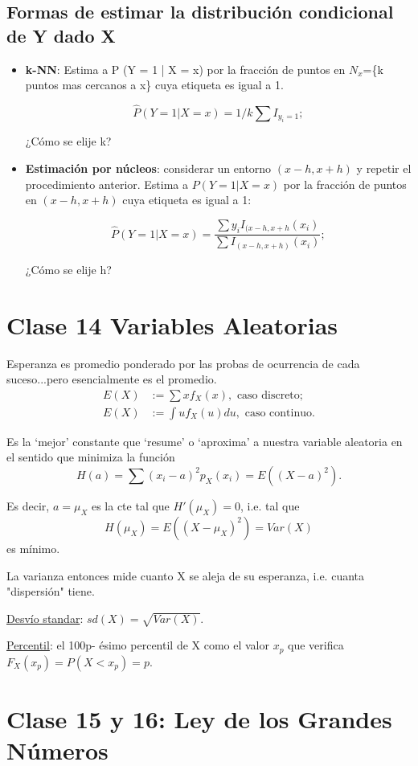 \documentclass[a4paper,12pt]{article}
\theoremstyle{definition}
\numberwithin{prop}{section}
\theoremstyle{remark}
\numberwithin{ej_subseccion}{subsection}
\begin{document}
	\subsection*{Formas de estimar la distribución condicional de Y dado X}
	
	\begin{itemize}
		\item \textbf{k-NN}: Estima a P (Y = 1 | X = x) por la fracción de puntos en $N_x$=\{k puntos mas cercanos a x\} cuya etiqueta es igual a 1.
		
		$$\hat{P}(Y=1|X=x)=1/k \sum I_{y_i=1};$$
		
		¿Cómo se elije k?
		\item \textbf{Estimación por núcleos}:
		considerar un entorno $(x - h, x + h)$ y repetir el procedimiento anterior. Estima a $P (Y = 1 | X = x)$ por la fracción de puntos en
		$(x - h, x + h)$ cuya etiqueta es igual a 1:
		
		$$\hat{P}(Y=1|X=x)=\frac{\sum y_iI_{(x-h,x+h}(x_i)}{\sum I_{(x-h,x+h)}(x_i)};$$
		
		¿Cómo se elije h?
	\end{itemize}
	
	\section*{Clase 14 Variables Aleatorias}
	Esperanza es promedio ponderado por las probas de ocurrencia de cada suceso...pero esencialmente es el promedio. 
	\begin{align*}
		E(X)&:=\sum x f_X(x),\text{ caso discreto};\\
		E(X)&:=\int u f_X(u) du,\text{ caso continuo}.
	\end{align*}
	
	Es la ‘mejor’ constante que ‘resume’ o ‘aproxima’ a nuestra variable aleatoria en el sentido que minimiza la función
	$$H(a)=\sum (x_i-a)^2p_X(x_i)=E((X-a)^2).$$
	
	Es decir, $a=\mu_X$ es la cte tal que $H'(\mu_X)=0$, i.e. tal que
	$$H(\mu_X)=E((X-\mu_X)^2)=Var(X)$$ 
	es mínimo.
	
	La varianza entonces mide cuanto X se aleja de su esperanza, i.e. cuanta "dispersión" tiene.
	
	\underline{Desvío standar}: $sd(X)= \sqrt{Var(X)}$.
	
	\underline{Percentil}: el 100p- ésimo percentil de X como el valor $x_p$ que verifica $F_X (x_p ) = P(X<x_p) = p$.

	\section*{Clase 15 y 16: Ley de los Grandes Números}
	
\end{document}
